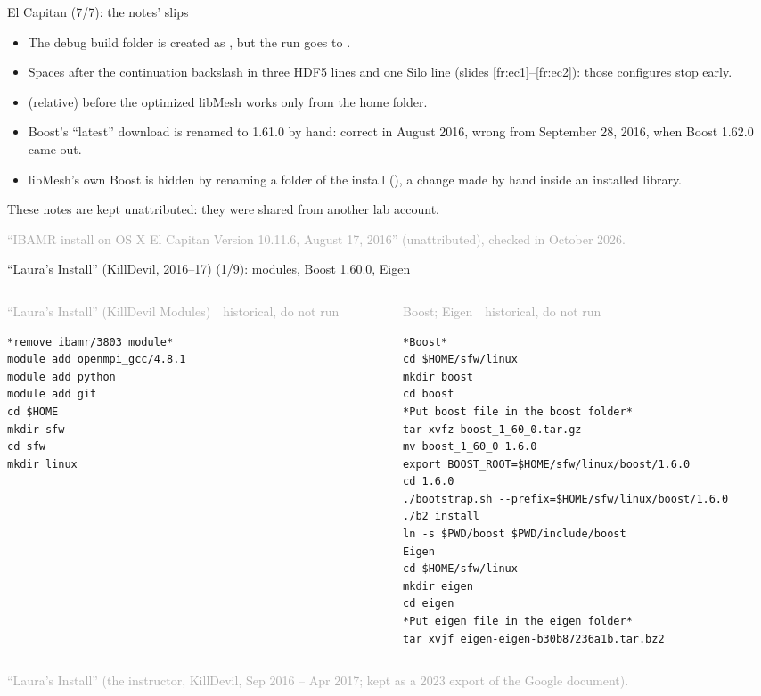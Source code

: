 \documentclass[aspectratio=169,11pt]{beamer}
\newcommand{\sourcecredit}[1]{\vfill\begin{flushright}\tiny\textcolor{DarkGray}{#1}\end{flushright}}
\newcommand{\hist}[1]{{\tiny\sffamily\textcolor{DarkGray}{#1\ \textbullet\ historical, do not run}}\par\nointerlineskip\vspace{0.3mm}}
\begin{document}
\begin{frame}{El Capitan (7/7): the notes' slips}
\label{fr:ec6}
\small
\begin{itemize}\setlength{\itemsep}{4pt}
  \item The debug build folder is created as , but the run goes to .
  \item Spaces after the continuation backslash in three HDF5 lines and one Silo line (slides \ref{fr:ec1}--\ref{fr:ec2}): those configures stop early.
  \item {} (relative) before the optimized libMesh works only from the home folder.
  \item Boost's ``latest'' download is renamed to 1.61.0 by hand: correct in August 2016, wrong from September 28, 2016, when Boost 1.62.0 came out.
  \item libMesh's own Boost is hidden by renaming a folder of the install (), a change made by hand inside an installed library.
\end{itemize}
\vspace{2mm}
\footnotesize These notes are kept unattributed: they were shared from another lab account.
\sourcecredit{``IBAMR install on OS X El Capitan Version 10.11.6, August 17, 2016'' (unattributed), checked in October 2026.}
\end{frame}

\begin{frame}[fragile]{``Laura's Install'' (KillDevil, 2016--17) (1/9): modules, Boost 1.60.0, Eigen}
\label{fr:li1}
\begin{columns}[T,onlytextwidth]
\begin{column}{0.48\textwidth}
\hist{``Laura's Install'' (KillDevil Modules)}
\begin{lstlisting}[style=hist]
*remove ibamr/3803 module*
module add openmpi_gcc/4.8.1
module add python
module add git
cd $HOME
mkdir sfw
cd sfw
mkdir linux
\end{lstlisting}
\end{column}
\begin{column}{0.49\textwidth}
\hist{Boost; Eigen}
\begin{lstlisting}[style=hist]
*Boost*
cd $HOME/sfw/linux
mkdir boost
cd boost
*Put boost file in the boost folder*
tar xvfz boost_1_60_0.tar.gz
mv boost_1_60_0 1.6.0
export BOOST_ROOT=$HOME/sfw/linux/boost/1.6.0
cd 1.6.0
./bootstrap.sh --prefix=$HOME/sfw/linux/boost/1.6.0
./b2 install
ln -s $PWD/boost $PWD/include/boost
Eigen
cd $HOME/sfw/linux
mkdir eigen
cd eigen
*Put eigen file in the eigen folder*
tar xvjf eigen-eigen-b30b87236a1b.tar.bz2
\end{lstlisting}
\end{column}
\end{columns}
\sourcecredit{``Laura's Install'' (the instructor, KillDevil, Sep 2016 -- Apr 2017; kept as a 2023 export of the Google document).}
\end{frame}
\end{document}
